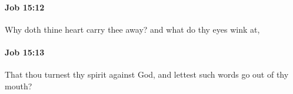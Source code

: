 		\paragraph{Job 15:12} %
			\label{JOB-15-12}

			Why doth thine heart carry thee away? and what do thy eyes wink at,


		\paragraph{Job 15:13} %
			\label{JOB-15-13}

			That thou turnest thy spirit against God, and lettest such words go out of thy mouth?


